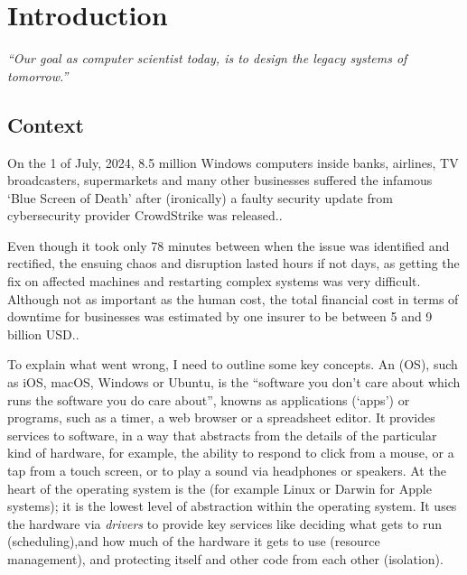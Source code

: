 \chapter{Introduction}\label{chap:intro}

\emph{“Our goal as computer scientist today, is to design the legacy systems of tomorrow.”}
\vspace{-1.5em}
\begin{flushright}
\end{flushright}

\margintoc%

\section{Context}

On the 1 of July, 2024, 8.5 million Windows computers inside banks, airlines, TV
broadcasters, supermarkets and many other businesses suffered the infamous `Blue Screen of
Death' after (ironically) a faulty security update from cybersecurity
provider CrowdStrike was released..

Even though it took only 78 minutes between when the issue was identified and
rectified, the ensuing chaos and disruption lasted hours if not days, as getting
the fix on affected machines and restarting complex systems was very difficult.
Although not as important as the human cost, the total financial cost in terms
of downtime for businesses was estimated by one insurer to be between 5 and 9
billion USD..

To explain what went wrong, I need to outline some key concepts. An
 (OS), such as iOS, macOS, Windows or Ubuntu, is
the ``software you don't care about which runs the software you do care
about'', knowns as applications (`apps') or programs, such as a timer, a web
browser or a spreadsheet editor. It provides services to software, in a way
that abstracts from the details of the particular kind of hardware, for
example, the ability to respond to click from a mouse, or a tap from a touch
screen, or to play a sound via headphones or speakers. At the heart of the
operating system is the  (for example Linux or Darwin for
Apple systems); it is the lowest level of abstraction within the operating
system. It uses the hardware via \emph{drivers} to provide key services like
deciding what gets to run (scheduling),and how much of the hardware it gets to
use (resource management), and protecting itself and other code from each other
(isolation).

